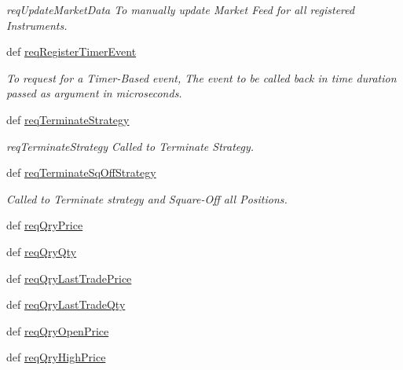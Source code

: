 \begin{DoxyCompactItemize}
\begin{DoxyCompactList}\small\item\em reqUpdateMarketData To manually update Market Feed for all registered Instruments. \item\end{DoxyCompactList}\item 
def \hyperlink{classmuTradePyBase_1_1CustomStrategy_a45cf7b8c54ce0ac8a226c3006ae20901}{reqRegisterTimerEvent}
\begin{DoxyCompactList}\small\item\em To request for a Timer-\/Based event, The event to be called back in time duration passed as argument in microseconds. \item\end{DoxyCompactList}\item 
def \hyperlink{classmuTradePyBase_1_1CustomStrategy_a6ebd2277cb90f65608bd4d636087b61e}{reqTerminateStrategy}
\begin{DoxyCompactList}\small\item\em reqTerminateStrategy Called to Terminate Strategy. \item\end{DoxyCompactList}\item 
def \hyperlink{classmuTradePyBase_1_1CustomStrategy_aead1310f3a4aa6c69d792ed18669bec1}{reqTerminateSqOffStrategy}
\begin{DoxyCompactList}\small\item\em Called to Terminate strategy and Square-\/Off all Positions. \item\end{DoxyCompactList}\item 
def \hyperlink{classmuTradePyBase_1_1CustomStrategy_a5315fa269b26a64625c3a79362e357e1}{reqQryPrice}
\item 
def \hyperlink{classmuTradePyBase_1_1CustomStrategy_ad6a87ecd9032561036aa40f83ed4c34f}{reqQryQty}
\item 
def \hyperlink{classmuTradePyBase_1_1CustomStrategy_a652f9a24a6b95f2f960555e5593c1fee}{reqQryLastTradePrice}
\item 
def \hyperlink{classmuTradePyBase_1_1CustomStrategy_a0a48ea343fcdffbf9bb24bcb0384af1d}{reqQryLastTradeQty}
\item 
def \hyperlink{classmuTradePyBase_1_1CustomStrategy_a72c9d6257adaa1e0a568e09f0df0ef15}{reqQryOpenPrice}
\item 
def \hyperlink{classmuTradePyBase_1_1CustomStrategy_aa66a4eb7129af05c92f0beaf335dfcd3}{reqQryHighPrice}
\item 

\end{DoxyCompactItemize}
